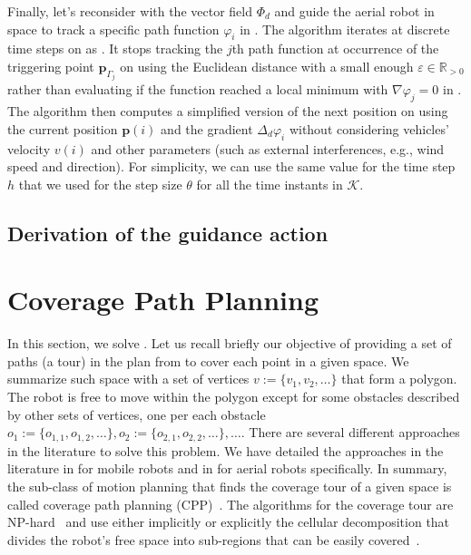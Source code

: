 Finally, let's reconsider  with the vector field $\varPhi_d$ and guide the aerial robot in space to track a specific path function $\varphi_i$ in . The algorithm iterates at discrete time steps on  as . It stops tracking the $j$th path function at occurrence of the triggering point $\mathbf{p}_{\Gamma_j}$ on  using the Euclidean distance with a small enough $\varepsilon\in\mathbb{R}_{>0}$ rather than evaluating if the function reached a local minimum with $\nabla\varphi_j=0$ in . The algorithm then computes a simplified version of the next position  on  using the current position $\mathbf{p}(i)$ and the gradient $\Delta_d\varphi_i$ without considering vehicles' velocity $v(i)$ and other parameters (such as external interferences, e.g., wind speed and direction). For simplicity, we can use the same value for the time step $h$ that we used for the step size $\theta$ for all the time instants in $\mathcal{K}$.



\subsection{\color{red}Derivation of the guidance action}


\section{Coverage Path Planning}
\label{sec:cov-path-plan}

In this section, we solve . Let us recall briefly our objective of providing a set of paths (a tour) in the plan from  to cover each point in a given space. We summarize such space with a set of vertices $v:=\{v_1,v_2,\dots\}$ that form a polygon. The robot is free to move within the polygon except for some obstacles described by other sets of vertices, one per each obstacle $o_1:=\{o_{1,1},o_{1,2},\dots\},o_2:=\{o_{2,1},o_{2,2},\dots\},\dots$. There are several different approaches in the literature to solve this problem. We have detailed the approaches in the literature in  for mobile robots and in  for aerial robots specifically. In summary, the sub-class of motion planning that finds the coverage tour of a given space is called coverage path planning (CPP)~\citep{choset1998coverage}. The algorithms for the coverage tour are NP-hard~\citep{arkin2000approximation} and use either implicitly or explicitly the cellular decomposition that divides the robot's free space into sub-regions that can be easily covered~\citep{choset2001coverage,galceran2013survey}.

